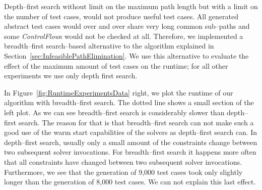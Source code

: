 \documentclass[runningheads,a4paper]{llncs}%
\newcommand{\UMLType}[1]{\textsf{\textit{#1}}} %
\begin{document}
Depth--first search without limit on the maximum path length but with a limit on
the number of test cases, would not produce useful test cases. All generated
abstract test cases would over and over share very long common sub--paths and
some \UMLType{ControlFlow}s would not be checked at all. Therefore, we
implemented a breadth--first search--based alternative to the algorithm
explained in Section~\ref{sec:InfeasiblePathElimination}. We use this
alternative to evaluate the effect of the maximum amount of test cases on the
runtime; for all other experiments we use only depth first search.

In Figure~\ref{fig:RuntimeExperimentsData} right, we plot the runtime of our
algorithm with breadth--first search. The dotted line shows a small section of
the left plot. As we can see breadth--first search is considerably slower than
depth--first search. The reason for that is that breadth--first search can not
make such a good use of the warm start capabilities of the solvers as
depth--first search can. In depth--first search, usually only a small amount of
the constraints change between two subsequent solver invocations. For
breadth--first search it happens more often that all constraints have changed
between two subsequent solver invocations. Furthermore, we see that the
generation of 9,000 test cases took only slightly longer than the generation of
8,000 test cases. We can not explain this last effect.
%
\end{document}
